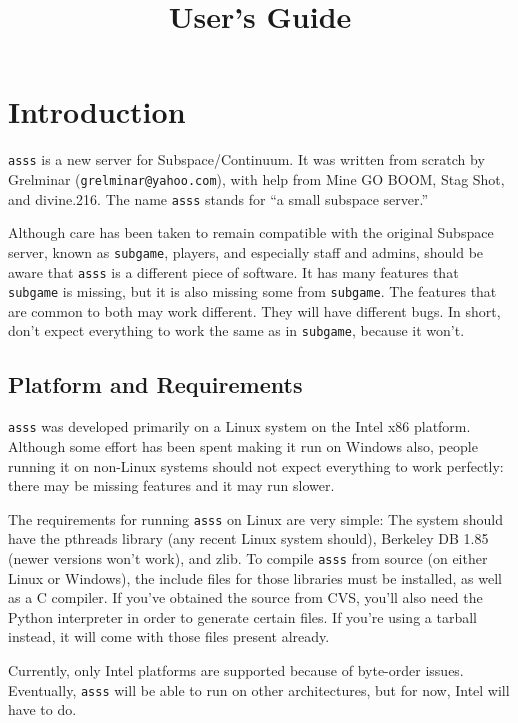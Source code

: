 \documentclass{article}
\title{\asss{} User's Guide}
\newcommand{\asss}{\texttt{asss}}
\newcommand{\subgame}{\texttt{subgame}}
\begin{document}
\maketitle

\section{Introduction}

\asss{} is a new server for Subspace/Continuum. It was written from
scratch by Grelminar (\verb/grelminar@yahoo.com/), with help from Mine
GO BOOM, Stag Shot, and divine.216. %
The name \asss{} stands for ``a small subspace server.''

Although care has been taken to remain compatible with the original
Subspace server, known as \subgame{}, players, and especially staff and
admins, should be aware that \asss{} is a different piece of software. It
has many features that \subgame{} is missing, but it is also missing some
from \subgame{}. The features that are common to both may work different.
They will have different bugs. In short, don't expect everything to work
the same as in \subgame{}, because it won't.

\subsection{Platform and Requirements}

\asss{} was developed primarily on a Linux system on the Intel x86
platform. Although some effort has been spent making it run on Windows
also, people running it on non-Linux systems should not expect
everything to work perfectly: there may be missing features and it may
run slower.

The requirements for running \asss{} on Linux are very simple: The
system should have the pthreads library (any recent Linux system
should), Berkeley DB 1.85 (newer versions won't work), and zlib. To
compile \asss{} from source (on either Linux or Windows), the include
files for those libraries must be installed, as well as a C compiler. If
you've obtained the source from CVS, you'll also need the Python
interpreter in order to generate certain files. If you're using a
tarball instead, it will come with those files present already.

Currently, only Intel platforms are supported because of byte-order
issues. Eventually, \asss{} will be able to run on other architectures,
but for now, Intel will have to do.
\end{document}

